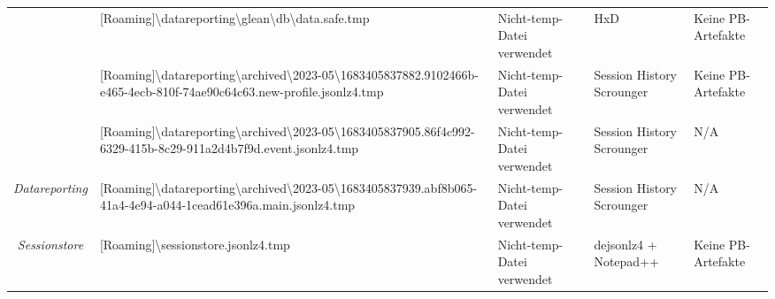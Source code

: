 \begin{appendices}
{\begin{landscape}
\begin{table}[h!]
{\begin{tabular}{cllll}
	\multicolumn{1}{|c|}{}                                                                                       & \multicolumn{1}{l|}{\cellcolor[HTML]{3190FF}[Roaming]\textbackslash{}datareporting\textbackslash{}glean\textbackslash{}db\textbackslash{}data.safe.tmp}                                                                      & \multicolumn{1}{l|}{\cellcolor[HTML]{FCFF2F}Nicht-temp-Datei verwendet}                           & \multicolumn{1}{l|}{HxD}                         & \multicolumn{1}{l|}{\cellcolor[HTML]{F8A102}Keine PB-Artefakte} \\ \cline{2-5} 
	\multicolumn{1}{|c|}{}                                                                                       & \multicolumn{1}{l|}{\cellcolor[HTML]{3190FF}[Roaming]\textbackslash{}datareporting\textbackslash{}archived\textbackslash{}2023-05\textbackslash{}1683405837882.9102466b-e465-4ecb-810f-74ae90c64c63.new-profile.jsonlz4.tmp} & \multicolumn{1}{l|}{\cellcolor[HTML]{FCFF2F}Nicht-temp-Datei verwendet}                           & \multicolumn{1}{l|}{Session History Scrounger}   & \multicolumn{1}{l|}{\cellcolor[HTML]{F8A102}Keine PB-Artefakte} \\ \cline{2-5} 
	\multicolumn{1}{|c|}{}                                                                                       & \multicolumn{1}{l|}{\cellcolor[HTML]{3190FF}[Roaming]\textbackslash{}datareporting\textbackslash{}archived\textbackslash{}2023-05\textbackslash{}1683405837905.86f4c992-6329-415b-8c29-911a2d4b7f9d.event.jsonlz4.tmp}       & \multicolumn{1}{l|}{\cellcolor[HTML]{FCFF2F}Nicht-temp-Datei verwendet}                           & \multicolumn{1}{l|}{Session History Scrounger}   & \multicolumn{1}{l|}{\cellcolor[HTML]{C0C0C0}N/A}                \\ \cline{2-5} 
	\multicolumn{1}{|c|}{\multirow{-4}{*}{\textit{Datareporting}}}                                               & \multicolumn{1}{l|}{\cellcolor[HTML]{3190FF}[Roaming]\textbackslash{}datareporting\textbackslash{}archived\textbackslash{}2023-05\textbackslash{}1683405837939.abf8b065-41a4-4e94-a044-1cead61e396a.main.jsonlz4.tmp}        & \multicolumn{1}{l|}{\cellcolor[HTML]{FCFF2F}Nicht-temp-Datei verwendet}                           & \multicolumn{1}{l|}{Session History Scrounger}   & \multicolumn{1}{l|}{\cellcolor[HTML]{C0C0C0}N/A}                \\ \hline
	\multicolumn{1}{|c|}{\textit{Sessionstore}}                                                                  & \multicolumn{1}{l|}{\cellcolor[HTML]{3190FF}[Roaming]\textbackslash{}sessionstore.jsonlz4.tmp}                                                                                                                               & \multicolumn{1}{l|}{\cellcolor[HTML]{FCFF2F}Nicht-temp-Datei verwendet}                           & \multicolumn{1}{l|}{dejsonlz4 + Notepad++}       & \multicolumn{1}{l|}{\cellcolor[HTML]{F8A102}Keine PB-Artefakte} \\ \hline

\end{tabular}}
\end{table}
\end{landscape}}
\end{appendices}
